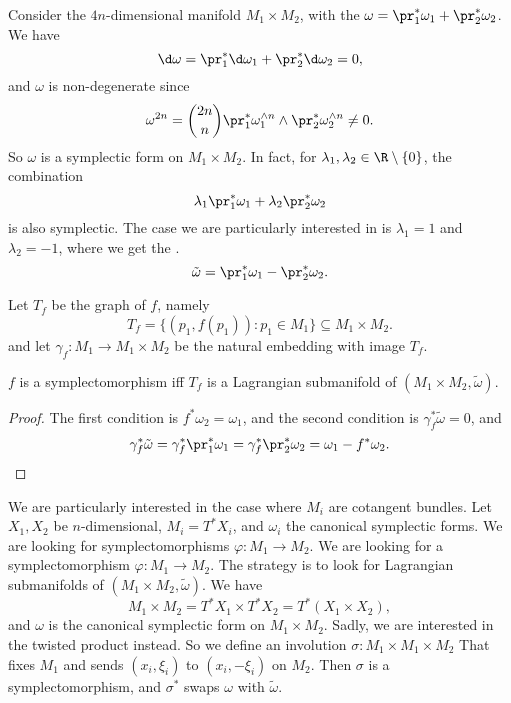 \documentclass[a4paper]{article}
\begin{document}
Consider the $4n$-dimensional manifold $M_1 \times M_2$, with the  $\omega = \pr_1^* \omega_1 + \pr_2^* \omega_2$. We have
\[
  \d \omega = \pr_1^* \d \omega_1 + \pr_2^* \d \omega_2 = 0,
\]
and $\omega$ is non-degenerate since
\[
  \omega^{2n} = \binom{2n}{n} \pr_1^* \omega_1^{\wedge n} \wedge \pr_2^* \omega_2^{\wedge n} \not= 0.
\]
So $\omega$ is a symplectic form on $M_1 \times M_2$. In fact, for $\lambda_1, \lambda_2 \in \R \setminus \{0\}$, the combination
\[
  \lambda_1 \pr_1^* \omega_1 + \lambda_2 \pr_2^* \omega_2
\]
is also symplectic. The case we are particularly interested in is $\lambda_1 = 1$ and $\lambda_2 = -1$, where we get the \index{$\tilde{\omega}$}.
\[
  \tilde{\omega} = \pr_1^* \omega_1 - \pr_2^* \omega_2.
\]

Let $T_f$ be the graph of $f$, namely
\[
  T_f = \{(p_1, f(p_1)) : p_1 \in M_1\} \subseteq M_1 \times M_2.
\]
and let $\gamma_f: M_1 \to M_1 \times M_2$ be the natural embedding with image $T_f$.

\begin{prop}
  $f$ is a symplectomorphism iff $T_f$ is a Lagrangian submanifold of $(M_1 \times M_2, \tilde{\omega})$.
\end{prop}
\begin{proof}
  The first condition is $f^* \omega_2 = \omega_1$, and the second condition is $\gamma_f^* \tilde{\omega} = 0$, and
  \[
    \gamma_f^* \tilde{\omega} = \gamma_f^* \pr_1^* \omega_1 = \gamma_f^* \pr_2^* \omega_2 = \omega_1 - f^* \omega_2.\qedhere
  \]
\end{proof}


We are particularly interested in the case where $M_i$ are cotangent bundles. Let $X_1, X_2$ be $n$-dimensional, $M_i = T^*X_i$, and $\omega_i$ the canonical symplectic forms. We are looking for symplectomorphisms $\varphi: M_1 \to M_2$. We are looking for a symplectomorphism $\varphi: M_1 \to M_2$. The strategy is to look for Lagrangian submanifolds of $(M_1 \times M_2, \tilde{\omega})$. We have
\[
  M_1 \times M_2 = T^* X_1 \times T^* X_2 = T^*(X_1 \times X_2),
\]
and $\omega$ is the canonical symplectic form on $M_1 \times M_2$. Sadly, we are interested in the twisted product instead. So we define an involution $\sigma: M_1 \times M_1 \times M_2$ That fixes $M_1$ and sends $(x_i, \xi_i)$ to $(x_i, -\xi_i)$ on $M_2$. Then $\sigma$ is a symplectomorphism, and $\sigma^*$ swaps $\omega$ with $\tilde{\omega}$.
\end{document}
